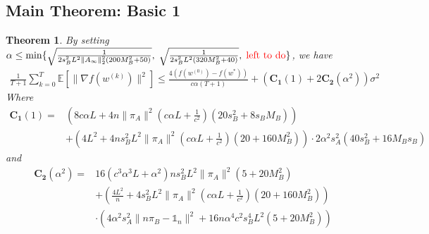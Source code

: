 \documentclass{article}
\newtheorem{theorem}{Theorem}
\newcommand{\EE}[1]{\mathbb{E}\left[#1\right]}
\newcommand{\norm}[1]{\| #1 \|}
\newcommand{\one}{\mathds{1}_n}
\begin{document}
\subsection{Main Theorem: Basic 1}
\begin{theorem}
By setting $\alpha \leq \min\{\sqrt{\frac{1}{2s_B^2L^2\norm{A_{\infty}}_2^2(200M_B^2+50)}},\; \sqrt{\frac{1}{2s_B^2L^2(320M_B^2+40)}},\; \textcolor{red}{\text{left to do}}\} $, we have 
\begin{align*}
  \frac{1}{T+1}\sum_{k=0}^T\EE{\norm{\nabla f(w^{(k)})}^2} 
\leq  \frac{4(f(w^{(0)})-f(w^{*}))}{c\alpha(T+1)}+\left(\mathbf{C_1}(1)+2\mathbf{C_2}(\alpha^2)\right)\sigma^2
\end{align*}
Where 
  \begin{align*}
    \mathbf{C_1}(1)=&\left(8c\alpha L+4n\norm{\pi_A}^2(c\alpha L +\frac{1}{c^2})(20s_B^2+8s_BM_B)\right)\\&+\left(4L^2+4ns_B^2L^2\norm{\pi_A}^2(c\alpha L+\frac{1}{c^2})(20+160M_B^2)\right)\cdot 2\alpha^2s_A^2(40s_B^2+16M_Bs_B)
  \end{align*}
  and
  \begin{align*}
    \mathbf{C_2}(\alpha^2)=&16(c^3\alpha^3 L + \alpha^2)n s_B^2 L^2\norm{\pi_A}^2(5+20M_B^2)\\&+\left(\frac{ 4L^2}{n}+4s_B^2L^2\norm{\pi_A}^2(c\alpha L+\frac{1}{c^2})(20+160M_B^2)\right)\\ &\cdot \left(4\alpha^2s_A^2\norm{n\pi_B-\one}^2+16n\alpha^4c^2s_B^4L^2(5+20M_B^2) \right)
  \end{align*}
\end{theorem}
\end{document}

